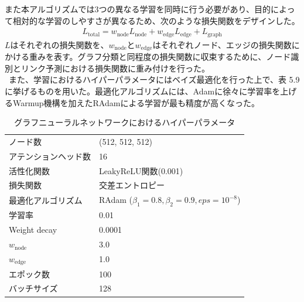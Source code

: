 また本アルゴリズムでは3つの異なる学習を同時に行う必要があり、目的によって相対的な学習のしやすさが異なるため、次のような損失関数をデザインした。\\
\begin{align}
L_{\mathrm{total}} = w_{\mathrm{node}} L_{\mathrm{node}} + w_{\mathrm{edge}} L_{\mathrm{edge}} +  L_{\mathrm{graph}}
\end{align}
$L$はそれぞれの損失関数を、$w_\mathrm{{node}}とw_\mathrm{{edge}}$はそれぞれノード、エッジの損失関数にかける重みを表す。グラフ分類と同程度の損失関数に収束するために、ノード識別とリンク予測における損失関数に重み付けを行った。\\
\ また、学習におけるハイパーパラメータにはベイズ最適化を行った上で、表 5.9%
に挙げるものを用いた。最適化アルゴリズムには、Adamに徐々に学習率を上げるWarmup機構を加えたRAdamによる学習が最も精度が高くなった。
\begin{table}[H]
 \centering
  \begin{tabular}{ l  l }
   \hline
   ノード数 & (512, 512, 512)\\
   アテンションヘッド数 & 16\\
   活性化関数 & LeakyReLU関数(0.001)\\
   損失関数 & 交差エントロピー\\
   最適化アルゴリズム & RAdam ($\beta_1 = 0.8, \beta_2 = 0.9, eps = 10^{-8}$)\\
   学習率 & 0.01\\
   Weight decay & 0.0001\\
    $w_{\mathrm{node}}$ & 3.0\\
    $w_{\mathrm{edge}}$ & 1.0\\
   エポック数 & 100\\
   バッチサイズ & 128\\
   \hline
  \end{tabular}
  \label{gnnsetting}
  \caption{グラフニューラルネットワークにおけるハイパーパラメータ}
\end{table}
